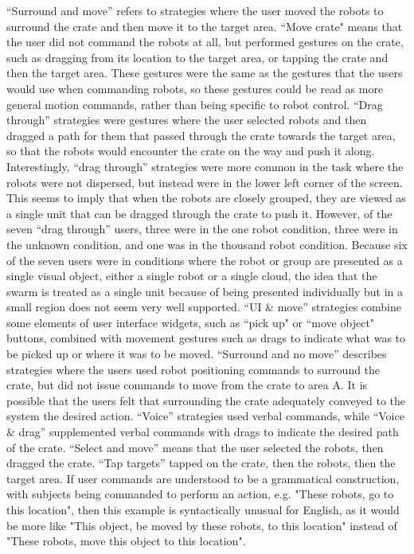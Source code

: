 ``Surround and move'' refers to strategies where the user moved the robots to surround the crate and then move it to the target area. 
``Move crate" means that the user did not command the robots at all, but performed gestures on the crate, such as dragging from its location to the target area, or tapping the crate and then the target area. 
These gestures were the same as the gestures that the users would use when commanding robots, so these gestures could be read as more general motion commands, rather than being specific to robot control. 
``Drag through'' strategies were gestures where the user selected robots and then dragged a path for them that passed through the crate towards the target area, so that the robots would encounter the crate on the way and push it along. 
Interestingly, ``drag through'' strategies were more common in the task where the robots were not dispersed, but instead were in the lower left corner of the screen. 
This seems to imply that when the robots are closely grouped, they are viewed as a single unit that can be dragged through the crate to push it. 
However, of the seven ``drag through'' users, three were in the one robot condition, three were in the unknown condition, and one was in the thousand robot condition. 
Because six of the seven users were in conditions where the robot or group are presented as a single visual object, either a single robot or a single cloud, the idea that the swarm is treated as a single unit because of being presented individually but in a small region does not seem very well supported. 
``UI \& move'' strategies combine some elements of user interface widgets, such as ``pick up" or ``move object" buttons, combined with movement gestures such as drags to indicate what was to be picked up or where it was to be moved. 
``Surround and no move'' describes strategies where the users used robot positioning commands to surround the crate, but did not issue commands to move from the crate to area A.
It is possible that the users felt that surrounding the crate adequately conveyed to the system the desired action. 
``Voice'' strategies used verbal commands, while ``Voice \& drag'' supplemented verbal commands with drags to indicate the desired path of the crate. 
``Select and move'' means that the user selected the robots, then dragged the crate.
``Tap targets'' tapped on the crate, then the robots, then the target area. 
If user commands are understood to be a grammatical construction, with subjects being commanded to perform an action, e.g. "These robots, go to this location", then this example is syntactically unusual for English, as it would be more like "This object, be moved by these robots, to this location" instead of "These robots, move this object to this location". 
